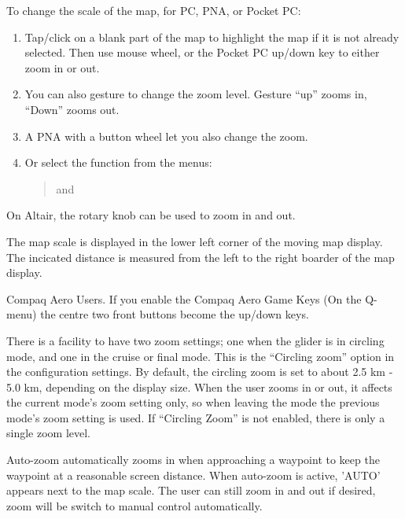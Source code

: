 \documentclass[a4paper,12pt]{refrep}
\begin{document}
To change the scale of the map, for PC, PNA, or Pocket PC:
\begin{enumerate}
\item Tap/click on a blank part of the map to highlight the map if it is not
already selected.
Then use mouse wheel, or the Pocket PC up/down key to either zoom
in or out.
\item You can also gesture to change the zoom level. Gesture  ``up'' zooms in, ``Down'' zooms out.
\item A PNA with a button wheel let you also change the zoom. 
\item Or select the function from the menus:
\begin{quote}
\blink{} and \blink{}
\end{quote}
\end{enumerate}
On Altair, the rotary knob can be used to zoom in and out.

The map scale is displayed in the lower left corner of the moving map
display. The incicated distance is measured from the left to the right boarder
of the map display.

Compaq Aero Users. If you enable the Compaq Aero Game Keys (On the
Q-menu) the centre two front buttons become the up/down keys.

There is a facility to have two zoom settings; one when the glider is
in circling mode, and one in the cruise or final mode.  This is the ``Circling
zoom'' option in the  configuration settings.  
By default, the circling zoom is set to about 2.5 km - 5.0 km, depending on the
display size. When the user zooms in or out, it affects the current
mode's zoom setting only, so when leaving the mode the previous mode's
zoom setting is used.  If ``Circling Zoom'' is not enabled,
there is only a single zoom level.

Auto-zoom automatically zooms in when approaching a waypoint to keep
the waypoint at a reasonable screen distance. When auto-zoom is active,
'AUTO' appears next to the map scale. The user can still zoom
in and out if desired, zoom will be switch to manual control automatically.
\end{document}
